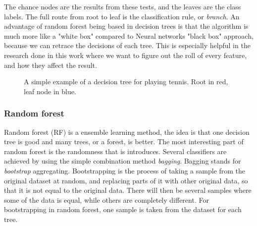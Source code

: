 The chance nodes are the results from these tests, and the leaves are the class labels. The full route from root to leaf is the classification rule, or \textit{branch}. An advantage of random forest being based in decision trees is that the algorithm is much more like a "white box" compared to Neural networks "black box" approach, because we can retrace the decisions of each tree. This is especially helpful in the research done in this work where we want to figure out the roll of every feature, and how they affect the result.

\begin{figure}[h]
\centering
{}
\caption{A simple example of a decision tree for playing tennis. Root in red, leaf node in blue.}
\label{fig:decision_tree}
\end{figure}
\subsubsection{Random forest}
Random forest (\ac{RF}) is a ensemble learning method, the idea is that one decision tree is good and many trees, or a forest, is better. The most interesting part of random forest is the randomness that is introduces. Several classifiers are achieved by using the simple combination method \textit{bagging}. Bagging stands for \textit{bootstrap} aggregating. Bootstrapping is the process of taking a sample from the original dataset at random, and replacing parts of it with other original data, so that it is not equal to the original data. There will then be several samples where some of the data is equal, while others are completely different. For bootstrapping in random forest, one sample is taken from the dataset for each tree.

